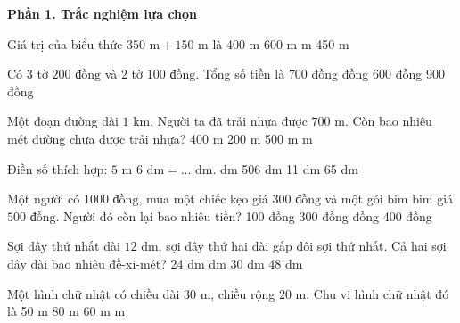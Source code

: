 \textbf{Phần 1. Trắc nghiệm lựa chọn}

\begin{ex} %
Giá trị của biểu thức $350\text{ m} + 150\text{ m}$ là
\choice
{400 m}
{600 m}
{ m}
{450 m}
\end{ex}

\begin{ex} %
Có $3$ tờ $200\text{ đồng}$ và $2$ tờ $100\text{ đồng}$. Tổng số tiền là
\choice
{700 đồng}
{ đồng}
{600 đồng}
{900 đồng}
\end{ex}

\begin{ex} %
Một đoạn đường dài $1\text{ km}$. Người ta đã trải nhựa được $700\text{ m}$. Còn bao nhiêu mét đường chưa được trải nhựa?
\choice
{400 m}
{200 m}
{500 m}
{ m}
\end{ex}

\begin{ex} %
Điền số thích hợp: $5\text{ m } 6\text{ dm} = \dots\text{ dm}$.
\choice
{ dm}
{506 dm}
{11 dm}
{65 dm}
\end{ex}

\begin{ex} %
Một người có $1 000\text{ đồng}$, mua một chiếc kẹo giá $300\text{ đồng}$ và một gói bim bim giá $500\text{ đồng}$. Người đó còn lại bao nhiêu tiền?
\choice
{100 đồng}
{300 đồng}
{ đồng}
{400 đồng}
\end{ex}

\begin{ex} %
Sợi dây thứ nhất dài $12\text{ dm}$, sợi dây thứ hai dài gấp đôi sợi thứ nhất. Cả hai sợi dây dài bao nhiêu đề-xi-mét?
\choice
{24 dm}
{ dm}
{30 dm}
{48 dm}
\end{ex}

\begin{ex} %
Một hình chữ nhật có chiều dài $30\text{ m}$, chiều rộng $20\text{ m}$. Chu vi hình chữ nhật đó là
\choice
{50 m}
{80 m}
{60 m}
{ m}
\end{ex}

